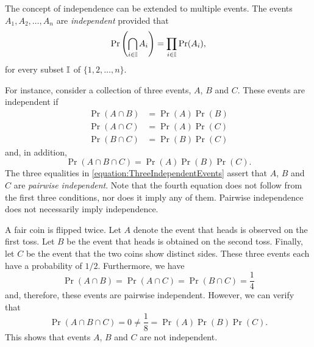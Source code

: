 The concept of independence can be extended to multiple events.
The events $A_1, A_2, \ldots, A_n$ are \emph{independent} provided that 
\begin{equation} \label{equation:IndependenceMultipleEvents}
\Pr \left( \bigcap_{i \in \mathbb{I}} A_i \right)
= \prod_{i \in \mathbb{I}} \Pr (A_i) ,
\end{equation}
for every subset $\mathbb{I}$ of $\{1, 2, \ldots, n\}$.

For instance, consider a collection of three events, $A$, $B$ and $C$.
These events are independent if
\begin{equation} \label{equation:ThreeIndependentEvents}
\begin{split}
\Pr (A \cap B) &= \Pr (A) \Pr (B) \\
\Pr (A \cap C) &= \Pr (A) \Pr (C) \\
\Pr (B \cap C) &= \Pr (B) \Pr (C)
\end{split}
\end{equation}
and, in addition,
\begin{equation*}
\Pr (A \cap B \cap C) = \Pr (A) \Pr (B) \Pr(C) .
\end{equation*}
The three equalities in \eqref{equation:ThreeIndependentEvents} assert that $A$, $B$ and $C$ are \emph{pairwise independent}.
Note that the fourth equation does not follow from the first three conditions, nor does it imply any of them.
Pairwise independence does not necessarily imply independence.

\begin{example}
A fair coin is flipped twice.
Let $A$ denote the event that heads is observed on the first toss.
Let $B$ be the event that heads is obtained on the second toss.
Finally, let $C$ be the event that the two coins show distinct sides.
These three events each have a probability of $1/2$.
Furthermore, we have
\begin{equation*}
\Pr (A \cap B) = \Pr (A \cap C) = \Pr (B \cap C) = \frac{1}{4}
\end{equation*}
and, therefore, these events are pairwise independent.
However, we can verify that
\begin{equation*}
\Pr (A \cap B \cap C) = 0 \neq \frac{1}{8} = \Pr (A) \Pr (B) \Pr (C) .
\end{equation*}
This shows that events $A$, $B$ and $C$ are not independent.
\end{example}

